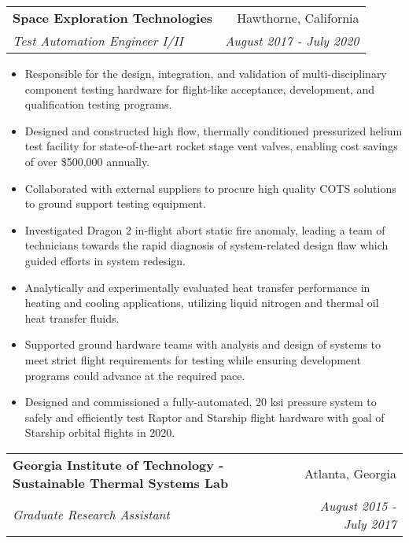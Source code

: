 \documentclass[letterpaper,11pt]{article}
\makeatletter
\newcommand{\resumeItem}[2]{
  \item\small{
    \textbf{#1}{: #2 \vspace{-2pt}}
  }
}
\newcommand{\resumeSubheading}[4]{
  \vspace{-1pt}\item
    \begin{tabular*}{0.97\textwidth}[t]{l@{\extracolsep{\fill}}r}
      \textbf{#1} & #2 \\
      \textit{\small#3} & \textit{\small #4} \\
    \end{tabular*}\vspace{-5pt}
}
\newcommand{\resumeSubSubheading}[2]{
    \begin{tabular*}{0.97\textwidth}{l@{\extracolsep{\fill}}r}
      \textit{\small#1} & \textit{\small #2} \\
    \end{tabular*}\vspace{-5pt}
}
\newcommand{\resumeSubHeadingListEnd}{\end{itemize}\vspace{-5pt}}
\newcommand{\resumeItemListStart}{\begin{itemize}}
\newcommand{\resumeItemListEnd}{\end{itemize}\vspace{-5pt}}
\makeatother
\begin{document}

    \resumeSubheading
      {Space Exploration Technologies}{Hawthorne, California}
      {Test Automation Engineer I/II}{August 2017 - July 2020}
      \resumeItemListStart
        	\item{Responsible for the design, integration, and validation of multi-disciplinary component testing hardware for flight-like acceptance, development, and qualification testing programs.}
	\item{Designed and constructed high flow, thermally conditioned pressurized helium test facility for state-of-the-art rocket stage vent valves, enabling cost savings of over \$500,000 annually.}
	\item{Collaborated with external suppliers to procure high quality COTS solutions to ground support testing equipment.}
	\item{Investigated Dragon 2 in-flight abort static fire anomaly, leading a team of technicians towards the rapid diagnosis of system-related design flaw which guided efforts in system redesign.}
	\item{Analytically and experimentally evaluated heat transfer performance in heating and cooling applications, utilizing liquid nitrogen and thermal oil heat transfer fluids.}
	\item{Supported ground hardware teams with analysis and design of systems to meet strict flight requirements for testing while ensuring development programs could advance at the required pace.}
	\item{Designed and commissioned a fully-automated, 20 ksi pressure system to safely and efficiently test Raptor and Starship flight hardware with goal of Starship orbital flights in 2020.}
      \resumeItemListEnd

    \resumeSubheading
      {Georgia Institute of Technology - Sustainable Thermal Systems Lab}{Atlanta, Georgia}
{Graduate Research Assistant}{August 2015 - July 2017}
\end{document}
